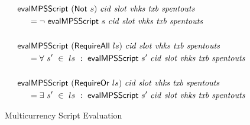 \begin{figure*}[htb]
\begin{align*}
    &\mathsf{evalMPSScript}~(\mathsf{Not}~s)~\mathit{cid}~\mathit{slot}~\mathit{vhks}
    ~\mathit{txb}~\mathit{spentouts}
   \\
    &~~~~ = \neg ~\mathsf{evalMPSScript}~s~\mathit{cid}~\mathit{slot}~\mathit{vhks}
    ~\mathit{txb}~\mathit{spentouts}\\~\\
    &\mathsf{evalMPSScript}~(\mathsf{RequireAll}~ls)~\mathit{cid}~\mathit{slot}~\mathit{vhks}
    ~\mathit{txb}~\mathit{spentouts}
   \\
    &~~~~ = \forall ~s'~ \in~ ls~:~\mathsf{evalMPSScript}~s'~\mathit{cid}~\mathit{slot}~\mathit{vhks}
    ~\mathit{txb}~\mathit{spentouts}\\~\\
    &\mathsf{evalMPSScript}~(\mathsf{RequireOr}~ls)~\mathit{cid}~\mathit{slot}~\mathit{vhks}
    ~\mathit{txb}~\mathit{spentouts}
   \\
    &~~~~ = \exists ~s'~ \in~ ls~:~\mathsf{evalMPSScript}~s'~\mathit{cid}~\mathit{slot}~\mathit{vhks}
    ~\mathit{txb}~\mathit{spentouts}\\
  \end{align*}
  \caption{Multicurrency Script Evaluation}
  \label{fig:defs:tx-mc-eval}
\end{figure*}



